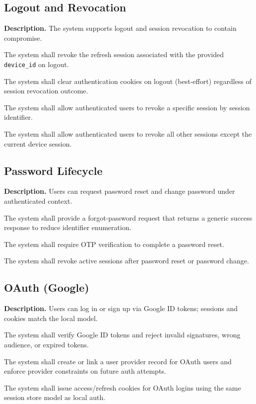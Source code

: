 \documentclass[11pt]{article}
\begin{document}
    \subsection{Logout and Revocation}
    \textbf{Description.} The system supports logout and session revocation to contain compromise.

    \begin{description}[leftmargin=0pt,labelwidth=3.2cm]
  \item[FR-18] The system shall revoke the refresh session associated with the provided \texttt{device\_id} on logout.
  \item[FR-19] The system shall clear authentication cookies on logout (best-effort) regardless of session revocation outcome.
  \item[FR-20] The system shall allow authenticated users to revoke a specific session by session identifier.
  \item[FR-21] The system shall allow authenticated users to revoke all other sessions except the current device session.
    \end{description}

    \subsection{Password Lifecycle}
    \textbf{Description.} Users can request password reset and change password under authenticated context.

    \begin{description}[leftmargin=0pt,labelwidth=3.2cm]
  \item[FR-22] The system shall provide a forgot-password request that returns a generic success response to reduce identifier enumeration.
  \item[FR-23] The system shall require OTP verification to complete a password reset.
  \item[FR-24] The system shall revoke active sessions after password reset or password change.
    \end{description}

    \subsection{OAuth (Google)}
    \textbf{Description.} Users can log in or sign up via Google ID tokens; sessions and cookies match the local model.

    \begin{description}[leftmargin=0pt,labelwidth=3.2cm]
  \item[FR-25] The system shall verify Google ID tokens and reject invalid signatures, wrong audience, or expired tokens.
  \item[FR-26] The system shall create or link a user provider record for OAuth users and enforce provider constraints on future auth attempts.
  \item[FR-27] The system shall issue access/refresh cookies for OAuth logins using the same session store model as local auth.
    \end{description}
\end{document}
